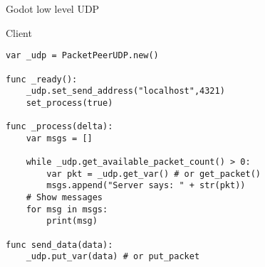 \begin{frame}[fragile]{Godot low level UDP}

Client

\begin{lstlisting}
var _udp = PacketPeerUDP.new()

func _ready():
	_udp.set_send_address("localhost",4321)
	set_process(true)

func _process(delta):
	var msgs = []

	while _udp.get_available_packet_count() > 0:
		var pkt = _udp.get_var() # or get_packet()
		msgs.append("Server says: " + str(pkt))
	# Show messages
	for msg in msgs:
		print(msg)

func send_data(data):
	_udp.put_var(data) # or put_packet
\end{lstlisting}

\end{frame}